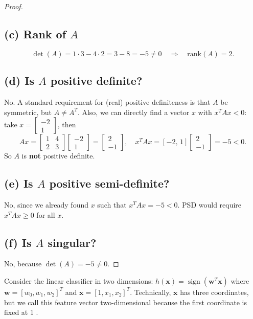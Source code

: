 \documentclass[en,hazy,blue,12pt,normal]{elegantnote}
\begin{document}
\begin{proof}
\subsection*{(c) Rank of $A$}
\[
\det(A)=1\cdot 3 - 4\cdot 2 = 3-8=-5\neq 0
\quad\Rightarrow\quad \mathrm{rank}(A)=2.
\]

\subsection*{(d) Is $A$ positive definite?}
No. A standard requirement for (real) positive definiteness is that $A$ be symmetric, but $A\neq A^T$.
Also, we can directly find a vector $x$ with $x^T A x<0$:
take $x=\begin{bmatrix}-2\\1\end{bmatrix}$, then
\[
Ax=\begin{bmatrix}1&4\\2&3\end{bmatrix}\begin{bmatrix}-2\\1\end{bmatrix}
=\begin{bmatrix}2\\-1\end{bmatrix},
\quad
x^T Ax = [-2,\,1]\begin{bmatrix}2\\-1\end{bmatrix}=-5<0.
\]
So $A$ is \textbf{not} positive definite.

\subsection*{(e) Is $A$ positive semi-definite?}
No, since we already found $x$ such that $x^T A x=-5<0$. PSD would require $x^T A x\ge 0$ for all $x$.

\subsection*{(f) Is $A$ singular?}
No, because $\det(A)=-5\neq 0$.

\end{proof}
\begin{homework}
   Consider the linear classifier in two dimensions: $h(\mathbf{x})=\operatorname{sign}\left(\mathbf{w}^T \mathbf{x}\right)$ where $\mathbf{w}=\left[w_0, w_1, w_2\right]^T$ and $\mathbf{x}=\left[1, x_1, x_2\right]^T$. Technically, $\mathbf{x}$ has three coordinates, but we call this feature vector two-dimensional because the first coordinate is fixed at 1 .
\end{homework}
\end{document}
